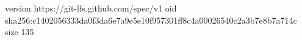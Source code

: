 version https://git-lfs.github.com/spec/v1
oid sha256:c1402056333da0f3da6e7a9e5e10f957301ff8c4a00026540c2a3b7e8b7a714c
size 135
